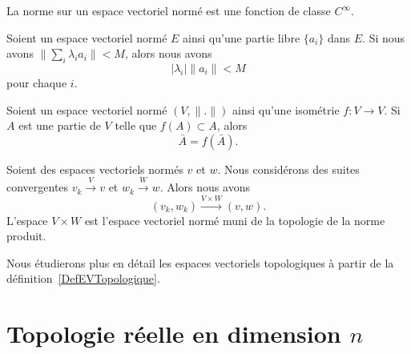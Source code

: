 \begin{proposition}     \label{PROPooQUAZooGXskwF}
	La norme sur un espace vectoriel normé est une fonction de classe \(  C^{\infty}\).
\end{proposition}

\begin{lemma}        \label{LEMooGCJEooOAynZW}
	Soient un espace vectoriel normé \( E\) ainsi qu'une partie libre \( \{ a_i \}\) dans \( E\). Si nous avons \( \| \sum_i\lambda_ia_i \|<M\), alors nous avons
	\begin{equation}
		| \lambda_i |\| a_i \|<M
	\end{equation}
	pour chaque \( i\).
\end{lemma}

\begin{lemma}       \label{LEMooSCIIooRyRrHA}
	Soient un espace vectoriel normé \( (V,\| . \|)\) ainsi qu'une isométrie \( f\colon V\to V\). Si \( A\) est une partie de \( V\) telle que \( f(A)\subset A\), alors
	\begin{equation}
		\bar A=f(\bar A).
	\end{equation}
\end{lemma}


\begin{proposition}	\label{PROPooMHAVooRgJjMB}
	Soient des espaces vectoriels normés \( v\) et \( w\). Nous considérons des suites convergentes \( v_k\stackrel{ V}{\longrightarrow} v\) et \( w_k\stackrel{ W}{\longrightarrow} w\). Alors nous avons
	\begin{equation}
		(v_k,w_k)\stackrel{ V\times W}{\longrightarrow} (v,w).
	\end{equation}
	L'espace \( V\times W\) est l'espace vectoriel normé muni de la topologie de la norme produit.
\end{proposition}


Nous étudierons plus en détail les espaces vectoriels topologiques à partir de la définition~\ref{DefEVTopologique}.


\section{Topologie réelle en dimension \( n\)}

